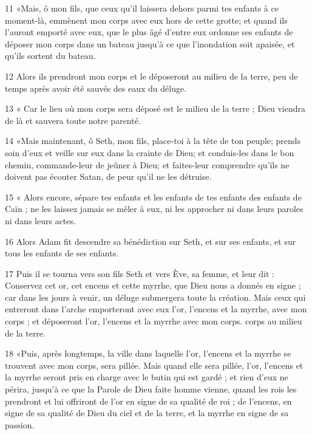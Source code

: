 \par 11 «Mais, ô mon fils, que ceux qu'il laissera dehors parmi tes enfants à ce moment-là, emmènent mon corps avec eux hors de cette grotte; et quand ils l'auront emporté avec eux, que le plus âgé d'entre eux ordonne ses enfants de déposer mon corps dans un bateau jusqu'à ce que l'inondation soit apaisée, et qu'ils sortent du bateau.

\par 12 Alors ils prendront mon corps et le déposeront au milieu de la terre, peu de temps après avoir été sauvés des eaux du déluge.

\par 13 « Car le lieu où mon corps sera déposé est le milieu de la terre ; Dieu viendra de là et sauvera toute notre parenté.

\par 14 «Mais maintenant, ô Seth, mon fils, place-toi à la tête de ton peuple; prends soin d'eux et veille sur eux dans la crainte de Dieu; et conduis-les dans le bon chemin, commande-leur de jeûner à Dieu; et faites-leur comprendre qu’ils ne doivent pas écouter Satan, de peur qu’il ne les détruise.

\par 15 « Alors encore, sépare tes enfants et les enfants de tes enfants des enfants de Caïn ; ne les laissez jamais se mêler à eux, ni les approcher ni dans leurs paroles ni dans leurs actes.

\par 16 Alors Adam fit descendre sa bénédiction sur Seth, et sur ses enfants, et sur tous les enfants de ses enfants.

\par 17 Puis il se tourna vers son fils Seth et vers Ève, sa femme, et leur dit : Conservez cet or, cet encens et cette myrrhe, que Dieu nous a donnés en signe ; car dans les jours à venir, un déluge submergera toute la création. Mais ceux qui entreront dans l’arche emporteront avec eux l’or, l’encens et la myrrhe, avec mon corps ; et déposeront l’or, l’encens et la myrrhe avec mon corps. corps au milieu de la terre.

\par 18 «Puis, après longtemps, la ville dans laquelle l'or, l'encens et la myrrhe se trouvent avec mon corps, sera pillée. Mais quand elle sera pillée, l'or, l'encens et la myrrhe seront pris en charge avec le butin qui est gardé ; et rien d’eux ne périra, jusqu’à ce que la Parole de Dieu faite homme vienne, quand les rois les prendront et lui offriront de l’or en signe de sa qualité de roi ; de l’encens, en signe de sa qualité de Dieu du ciel et de la terre, et la myrrhe en signe de sa passion.

